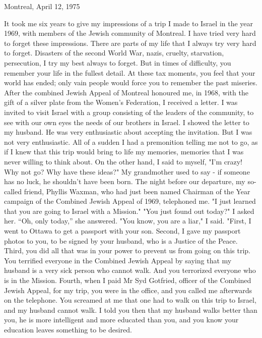 Montreal, April 12, 1975 

It took me six years to give my impressions of a trip I made  to Israel in the year 1969, with members of the Jewish community of Montreal.
I have tried very hard to forget these impressions.
There are parts of my life that I always try very hard to forget.
Disasters of the second World War, nazis, cruelty, starvation, persecution, I try my best always to forget.
But in times of difficulty, you remember your life in the fullest detail.
At these tax moments, you feel that your world has ended; only vain people would force you to remember the past miseries.
After the combined Jewish Appeal of Montreal honoured me, in 1968, with the gift of a silver plate from the Women's Federation, I received a letter.
I was invited to visit Israel with a group consisting of the leaders of the community, to see with our own eyes the needs of our brothers in Israel.
I showed the letter to my husband.
He was very enthusiastic about accepting the invitation.
But I was not very enthusiastic.
All of a sudden I had a premonition telling me not to go, as if I knew that this trip would bring to life my memories, memories that I was never willing to think about.
On the other hand, I said to myself, "I'm crazy!
Why not go?
Why have these ideas?"
My grandmother used to say  - if someone has no luck, he shouldn't have been born.
The night before our departure, my so-called friend, Phyllis Waxman, who had just been named Chairman of the Year campaign of the Combined Jewish Appeal of 1969, telephoned me.
"I just learned that you are going to Israel with a Mission."
"You just found out today?"
I asked her.
“Oh, only today,” she answered.
"You know, you are a liar," I said.
"First, I went to Ottawa to get a passport with your son.
Second, I gave my passport photos to you, to be signed by your husband, who is a Justice of the Peace.
Third, you did all that was in your power to prevent us from going on this trip.
You terrified everyone in the Combined 
Jewish Appeal by saying that my husband is a very sick person who cannot walk.
And you terrorized everyone who is in the Mission.
Fourth, when I paid Mr Syd Gotfried, officer of the Combined Jewish Appeal, for my trip, you were in the office, and you called me afterwards on the telephone.
You screamed at me that one had to  walk on this trip to Israel, and my husband cannot walk.
I told you then that my husband walks better than you, he is more intelligent and more educated than you, and you know your education leaves something to be desired.
